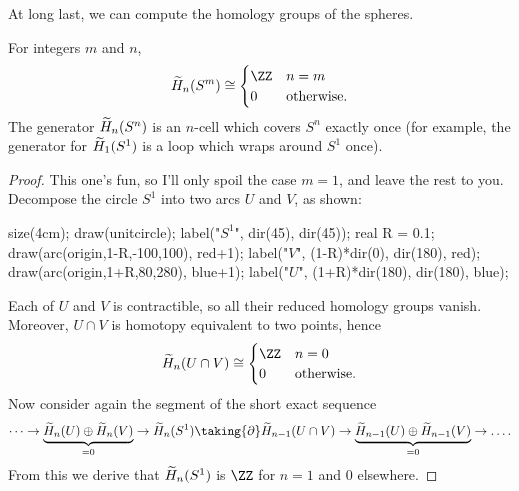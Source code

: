At long last, we can compute the homology groups of the spheres.
\begin{theorem}
	\label{thm:reduced_homology_sphere}
	For integers $m$ and $n$,
	\[ \wt H_n(S^m) \cong
	\begin{cases}
		\ZZ & n=m \\
		0 & \text{otherwise}.
	\end{cases}
	\]
	The generator $\widetilde H_n(S^n)$ is an $n$-cell which covers $S^n$
	exactly once (for example, the generator for $\widetilde H_1(S^1)$
	is a loop which wraps around $S^1$ once).
\end{theorem}
\begin{proof}
	This one's fun, so I'll only spoil the case $m=1$, and leave the rest to you.
	Decompose the circle $S^1$ into two arcs $U$ and $V$, as shown:
	\begin{center}
		\begin{asy}
			size(4cm);
			draw(unitcircle);
			label("$S^1$", dir(45), dir(45));
			real R = 0.1;
			draw(arc(origin,1-R,-100,100), red+1);
			label("$V$", (1-R)*dir(0), dir(180), red);
			draw(arc(origin,1+R,80,280), blue+1);
			label("$U$", (1+R)*dir(180), dir(180), blue);
		\end{asy}
	\end{center}
	Each of $U$ and $V$ is contractible, so all their reduced homology groups vanish.
	Moreover, $U \cap V$ is homotopy equivalent to two points,
	hence 
	\[ \wt H_n(U \cap V) \cong
		\begin{cases}
			\ZZ & n = 0 \\
			0 & \text{otherwise}.
		\end{cases}
	\]
	Now consider again the segment of the short exact sequence
	\[ 
		\dots \to
		\underbrace{\wt H_n(U) \oplus \wt H_n(V)}_{= 0} \to
		\wt H_n(S^1) \taking{\partial} \wt H_{n-1}(U \cap V) \to
		\underbrace{\wt H_{n-1}(U) \oplus \wt H_{n-1}(V)}_{=0} \to \dots.
	\]
	From this we derive that $\widetilde H_n(S^1)$ is $\ZZ$ for $n=1$ and $0$ elsewhere.


\end{proof}
